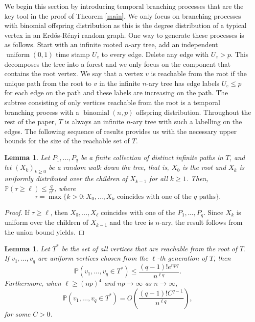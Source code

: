 \documentclass[11pt]{article}
\newtheorem{lemma}[theorem]{Lemma}
\newcommand{\1}{\mathbf{1}} %
\newcommand{\prob}{\mathbb{P}} %
\newcommand{\bin}{\ensuremath{\operatorname{binomial}}} %
\newcommand{\unif}{\ensuremath{\operatorname{uniform}}} %
\begin{document}
We begin this section by introducing temporal branching processes that are the key tool
in the proof of Theorem \ref{main}.
We only focus on branching processes with binomial offspring distribution as this is the degree distribution of a typical vertex in an Erd\H{o}s-R\'enyi random graph.
One way to generate these processes is as follows.
Start with an infinite rooted $n$-ary tree, add an independent $\unif(0,1)$ time stamp $U_e$
to every edge. Delete any edge with $U_e > p$. This decomposes the tree into a forest
and we only focus on the component that contains the root vertex.
We say that a vertex $v$ is reachable from the root if the unique path from the root to $v$ in the infinite $n$-ary tree has edge labels $U_e \leq p$ for each edge on the path and these labels are increasing on the path.
The subtree consisting of only vertices reachable from the root is a temporal branching process with a $\bin(n,p)$ offspring distribution. Throughout the rest of the paper, $T$ is always an infinite $n$-ary tree with such a labelling on the edges. The following sequence of results provides us with the necessary upper bounds for the size of the reachable set of $T$.


\begin{lemma}\label{treesep}
Let $P_1,\ldots,P_q$ be a finite collection of distinct infinite paths in $T$, and let $(X_k)_{k \geq 0}$ be a random walk down the tree, that is, $X_0$ is the root and $X_k$ is uniformly distributed over the children of $X_{k-1}$ for all $k \geq 1$. Then, $\prob(\tau \geq \ell) \leq \frac{q}{n^\ell}$, where
$$\tau = \max\{ k > 0 : X_0,\ldots,X_k \text{ coincides with one of the $q$ paths}\}.$$
\end{lemma}


\begin{proof}
If $\tau \geq \ell$, then $X_0,\ldots,X_\ell$ coincides with one of the $P_1,\ldots,P_q$. Since $X_k$ is uniform over the children of $X_{k-1}$ and the tree is $n$-ary, the result follows from the union bound yields.
\end{proof}


\begin{lemma}\label{treesurvival}
Let $T^*$ be the set of all vertices that are reachable from the root of $T$. If $v_1,\ldots,v_q$ are uniform vertices chosen from the $\ell$-th generation of $T$, then
$$\prob(v_1,\ldots,v_q \in T^*) \leq \frac{(q-1)!e^{npq}}{n^{\ell q}}.$$
Furthermore, when $\ell \geq (np)^4$ and $np \to \infty$ as $n \to \infty$,
$$\prob(v_1,\ldots,v_q \in T^*) = O\left(\frac{(q-1)!C^{q-1}}{n^{\ell q}}\right),$$
for some $C > 0$.
\end{lemma}
\end{document}
